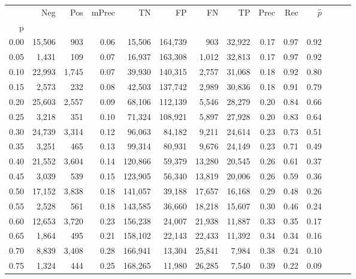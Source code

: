 \begin{tabular}{rrrrrrrrrrrrrr}
\toprule
{} &     Neg &    Pos & mPrec &       TN &       FP &      FN &      TP &  Prec &   Rec & $\hat{p}$ \\
p    &         &        &       &          &          &         &         &       &       &           \\
\midrule
0.00 &  15,506 &    903 &  0.06 &   15,506 &  164,739 &     903 &  32,922 &  0.17 &  0.97 &      0.92 \\
0.05 &   1,431 &    109 &  0.07 &   16,937 &  163,308 &   1,012 &  32,813 &  0.17 &  0.97 &      0.92 \\
0.10 &  22,993 &  1,745 &  0.07 &   39,930 &  140,315 &   2,757 &  31,068 &  0.18 &  0.92 &      0.80 \\
0.15 &   2,573 &    232 &  0.08 &   42,503 &  137,742 &   2,989 &  30,836 &  0.18 &  0.91 &      0.79 \\
0.20 &  25,603 &  2,557 &  0.09 &   68,106 &  112,139 &   5,546 &  28,279 &  0.20 &  0.84 &      0.66 \\
0.25 &   3,218 &    351 &  0.10 &   71,324 &  108,921 &   5,897 &  27,928 &  0.20 &  0.83 &      0.64 \\
0.30 &  24,739 &  3,314 &  0.12 &   96,063 &   84,182 &   9,211 &  24,614 &  0.23 &  0.73 &      0.51 \\
0.35 &   3,251 &    465 &  0.13 &   99,314 &   80,931 &   9,676 &  24,149 &  0.23 &  0.71 &      0.49 \\
0.40 &  21,552 &  3,604 &  0.14 &  120,866 &   59,379 &  13,280 &  20,545 &  0.26 &  0.61 &      0.37 \\
0.45 &   3,039 &    539 &  0.15 &  123,905 &   56,340 &  13,819 &  20,006 &  0.26 &  0.59 &      0.36 \\
0.50 &  17,152 &  3,838 &  0.18 &  141,057 &   39,188 &  17,657 &  16,168 &  0.29 &  0.48 &      0.26 \\
0.55 &   2,528 &    561 &  0.18 &  143,585 &   36,660 &  18,218 &  15,607 &  0.30 &  0.46 &      0.24 \\
0.60 &  12,653 &  3,720 &  0.23 &  156,238 &   24,007 &  21,938 &  11,887 &  0.33 &  0.35 &      0.17 \\
0.65 &   1,864 &    495 &  0.21 &  158,102 &   22,143 &  22,433 &  11,392 &  0.34 &  0.34 &      0.16 \\
0.70 &   8,839 &  3,408 &  0.28 &  166,941 &   13,304 &  25,841 &   7,984 &  0.38 &  0.24 &      0.10 \\
0.75 &   1,324 &    444 &  0.25 &  168,265 &   11,980 &  26,285 &   7,540 &  0.39 &  0.22 &      0.09 \\

\end{tabular}
